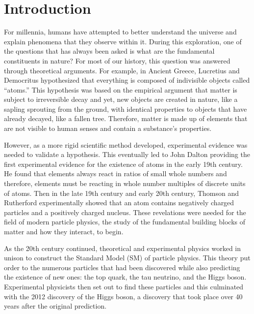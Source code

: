 \chapter{Introduction}
\label{ch:Intro}

For millennia, humans have attempted to better understand the universe and explain phenomena that they observe within it. During this exploration, one of the questions that has always been asked is what are the fundamental constituents in nature? For most of our history, this question was answered through theoretical arguments. For example, in Ancient Greece, Lucretius and Democritus hypothesized that everything is composed of indivisible objects called “atoms.” This hypothesis was based on the empirical argument that matter is subject to irreversible decay and yet, new objects are created in nature, like a sapling sprouting from the ground, with identical properties to objects that have already decayed, like a fallen tree. Therefore, matter is made up of elements that are not visible to human senses and contain a substance’s properties. 

However, as a more rigid scientific method developed, experimental evidence was needed to validate a hypothesis. This eventually led to John Dalton providing the first experimental evidence for the existence of atoms in the early 19th century. He found that elements always react in ratios of small whole numbers and therefore, elements must be reacting in whole number multiples of discrete units of atoms. Then in the late 19th century and early 20th century, Thomson and Rutherford experimentally showed that an atom contains negatively charged particles and a positively charged nucleus. These revelations were needed for the field of modern particle physics, the study of the fundamental building blocks of matter and how they interact, to begin. 

As the 20th century continued, theoretical and experimental physics worked in unison to construct the Standard Model (SM) of particle physics. This theory put order to the numerous particles that had been discovered while also predicting the existence of new ones: the top quark, the tau neutrino, and the Higgs boson. Experimental physicists then set out to find these particles and this culminated with the 2012 discovery of the Higgs boson, a discovery that took place over 40 years after the original prediction. 

